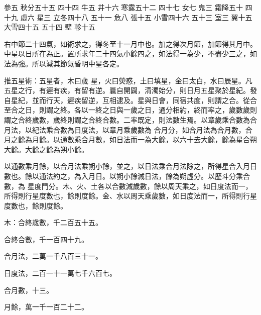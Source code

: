 \begin{pinyinscope}
參五
 秋分五十五
 四十四
 牛五
 井十六
 寒露五十二
 四十七
 女七
 鬼三
 霜降五十
 四十九
 虛六
 星三
 立冬四十八
 五十一
 危八
 張十五
 小雪四十六
 五十三
 室三
 翼十五
 大雪四十五
 五十四
 壁
 軫十五



 右中節二十四氣，如術求之，得冬至十一月中也。加之得次月節，加節得其月中。中星以日所在為正。置所求年二十四氣小餘四之，如法得一為少，不盡少三之，如法為強。所以減其節氣昏明中星各定。



 推五星術：五星者，木曰歲
 星，火曰熒惑，土曰填星，金曰太白，水曰辰星。凡五星之行，有遲有疾，有留有逆。曩自開闢，清濁始分，則日月五星聚於星紀。發自星紀，並而行天，遲疾留逆，互相逮及。星與日會，同宿共度，則謂之合。從合至合之日，則謂之終。各以一終之日與一歲之日，通分相約，終而率之，歲數歲則謂之合終歲數，歲終則謂之合終合數。二率既定，則法數生焉。以章歲乘合數為合月法，以紀法乘合數為日度法，以章月乘歲數為
 合月分，如合月法為合月數，合月之餘為月餘。以通數乘合月數，如日法而一為大餘，以六十去大餘，餘為星合朔大餘。大餘之餘為朔小餘。



 以通數乘月餘，以合月法乘朔小餘，並之，以日法乘合月法除之，所得星合入月日數也。餘以通法約之，為入月日。以朔小餘減日法，餘為朔虛分。以歷斗分乘合數，為
 星度鬥分。木、火、土各以合數減歲數，餘以周天乘之，如日度法而一，所得則行星度數也，餘則度餘。金、水以周天乘歲數，如日度法而一，所得則行星度數也，餘則度餘。



 木：合終歲數，千二百五十五。



 合終合數，千一百四十九。



 合月法，二萬一千八百三十一。



 日度法，二百一十一萬七千六百七。



 合月數，十三。



 月餘，萬一千一百二十二。




\end{pinyinscope}
